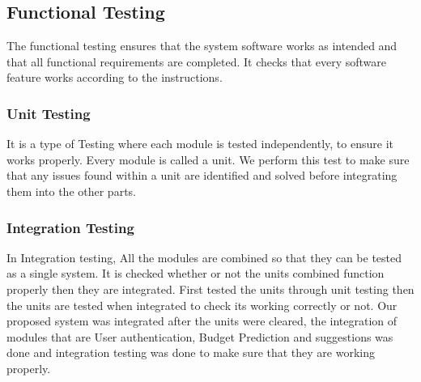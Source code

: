 \documentclass[12pt]{article}
\begin{document}
\noindent
\subsection{Functional Testing}
\vspace{0.5cm} %

\noindent
\normalsize The functional testing ensures that the system software works as intended and that all functional requirements are completed. It checks that every software feature works according to the instructions.
\vspace{0.5cm} %

\noindent
\subsubsection{Unit Testing}
\vspace{0.5cm} %

\noindent
\normalsize It is a type of Testing where each module is tested independently, to ensure it works properly. Every module is called a unit. We perform this test to make sure that any issues found within a unit are identified and solved before integrating them into the other parts.
\vspace{0.5cm} %

\noindent
\subsubsection{Integration Testing}
\vspace{0.5cm} %

\noindent
\normalsize In Integration testing, All the modules are combined so that they can be tested as a single system. It is checked whether or not the units combined function properly then they are integrated.\cite{chianglin2008personal} First tested the units through unit testing then the units are tested when integrated to check its working correctly or not. Our proposed system was integrated after the units were cleared, the integration of modules that are User authentication, Budget Prediction and suggestions was done and integration testing was done to make sure that they are working properly.\cite{french2021personal}
\vspace{0.5cm} %
\end{document}

